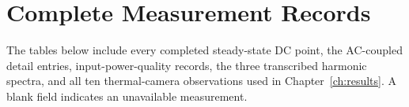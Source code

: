 \section{Complete Measurement Records}
\label{app:rewritten-measurement-records}
The tables below include every completed steady-state DC point, the AC-coupled
detail entries, input-power-quality records, the three transcribed harmonic
spectra, and all ten thermal-camera observations used in Chapter~\ref{ch:results}.
A blank field indicates an unavailable measurement.







